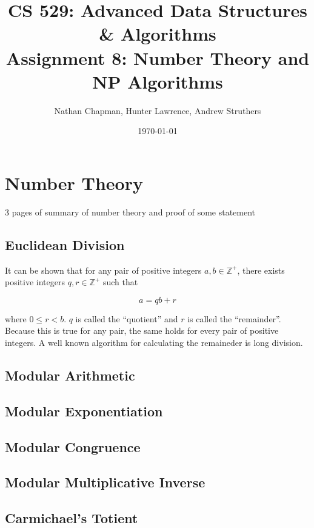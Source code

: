 \documentclass{article}
\title{\vspace*{-0.625in}CS 529: Advanced Data Structures \& Algorithms \\ Assignment 8: Number Theory and NP Algorithms}
\author{Nathan Chapman, Hunter Lawrence, Andrew Struthers}
\date{\today}
\renewcommand{\_}{\ifincsname_\else\legacyunderscore\fi}
\begin{document}
\maketitle

\section*{Number Theory}

    3 pages of summary of number theory and proof of some statement

    \subsection*{Euclidean Division}

        It can be shown that for any pair of positive integers $a, b \in \mathbb{Z}^+$, there exists positive integers $q, r \in \mathbb{Z}^+$ such that 

        \begin{equation}
            a = q b + r
        \end{equation}

        where $0 \leq r < b$.  $q$ is called the ``quotient'' and $r$ is called the ``remainder''.  Because this is true for any pair, the same holds for every pair of positive integers.  A well known algorithm for calculating the remaineder is long division.

    \subsection*{Modular Arithmetic}

    \subsection*{Modular Exponentiation}

    \subsection*{Modular Congruence}

    \subsection*{Modular Multiplicative Inverse}

    \subsection*{Carmichael's Totient}
\end{document}
